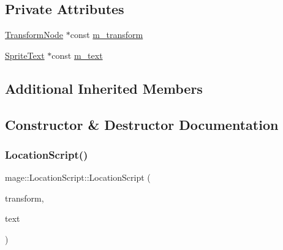 \subsection*{Private Attributes}
\begin{DoxyCompactItemize}
\item 
\hyperlink{structmage_1_1_transform_node}{Transform\+Node} $\ast$const \hyperlink{classmage_1_1_location_script_a6e4ed33a4d2031c8726731c64b8200c9}{m\+\_\+transform}
\item 
\hyperlink{classmage_1_1_sprite_text}{Sprite\+Text} $\ast$const \hyperlink{classmage_1_1_location_script_a90b8eae6654c666d0f628f906b9ef20d}{m\+\_\+text}
\end{DoxyCompactItemize}
\subsection*{Additional Inherited Members}


\subsection{Constructor \& Destructor Documentation}
\hypertarget{classmage_1_1_location_script_ae4150c94a0ac7524875596a6cbce4fe4}{}\label{classmage_1_1_location_script_ae4150c94a0ac7524875596a6cbce4fe4} 
\subsubsection{\texorpdfstring{Location\+Script()}{LocationScript()}\hspace{0.1cm}{\footnotesize\ttfamily [1/3]}}
{\footnotesize\ttfamily mage\+::\+Location\+Script\+::\+Location\+Script (\begin{DoxyParamCaption}\item[{\hyperlink{structmage_1_1_transform_node}{Transform\+Node} $\ast$}]{transform,  }\item[{\hyperlink{classmage_1_1_sprite_text}{Sprite\+Text} $\ast$}]{text }\end{DoxyParamCaption})\hspace{0.3cm}{\ttfamily [explicit]}}

\hypertarget{classmage_1_1_location_script_a53fb0562896eadb4c747d53b53f65b40}{}\label{classmage_1_1_location_script_a53fb0562896eadb4c747d53b53f65b40} 
